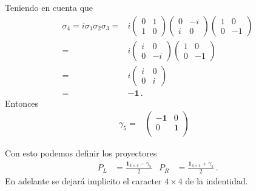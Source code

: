 Teniendo en cuenta que
\begin{align}
  \sigma_4=i\sigma_1\sigma_2\sigma_3=&
  i\begin{pmatrix}
    0 & 1 \\
    1 & 0 
  \end{pmatrix}
  \begin{pmatrix}
    0 & -i \\
    i & 0
  \end{pmatrix}
  \begin{pmatrix}
    1 & 0 \\
    0 & -1
  \end{pmatrix}\nonumber\\
  =&
  i\begin{pmatrix}
    i & 0 \\
    0 & -i 
  \end{pmatrix}
  \begin{pmatrix}
    1 & 0 \\
    0 & -1
  \end{pmatrix}\nonumber\\
  =&i\begin{pmatrix}
    i & 0 \\
    0 & i
  \end{pmatrix}\nonumber\\
  =&-\mathbf{1}\,.
\end{align}
Entonces
\begin{align}
  \gamma_5=&
  \begin{pmatrix}
    -\mathbf{1} & 0\\
    0  & \mathbf{1}\\
  \end{pmatrix}& 
\end{align}

Con esto podemos definir los proyectores
\begin{align}
  P_L&=\frac{\mathbf{1}_{4\times4}-\gamma_5}{2} & P_R&=\frac{\mathbf{1}_{4\times4}+\gamma_5}{2}\,.
\end{align}
En adelante se dejará implicito el caracter $4\times4$ de la indentidad. 

